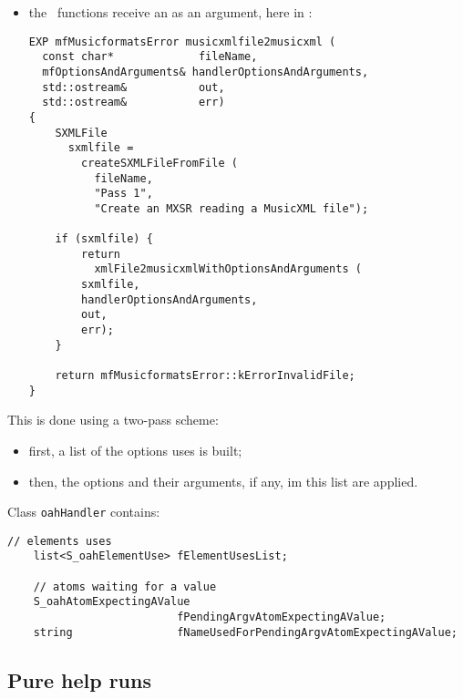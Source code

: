 {\begin{itemize}
\begin{lstlisting}[language=CPlusPlus]
  // create the global run data
  // ------------------------------------------------------

  gGlobalServiceRunData =
    mfServiceRunData::create (serviceName);

  // ... ... ...
}
\end{lstlisting}

\item the \API\ functions receive an  as an argument, here in :
\begin{lstlisting}[language=CPlusPlus]
EXP mfMusicformatsError musicxmlfile2musicxml (
  const char*             fileName,
  mfOptionsAndArguments& handlerOptionsAndArguments,
  std::ostream&           out,
  std::ostream&           err)
{
	SXMLFile
	  sxmlfile =
	    createSXMLFileFromFile (
	      fileName,
	      "Pass 1",
	      "Create an MXSR reading a MusicXML file");

	if (sxmlfile) {
		return
		  xmlFile2musicxmlWithOptionsAndArguments (
        sxmlfile,
        handlerOptionsAndArguments,
        out,
        err);
	}

	return mfMusicformatsError::kErrorInvalidFile;
}
\end{lstlisting}

\end{itemize}

This is done using a two-pass scheme:
\begin{itemize}
\item first, a list of the options uses is built;
\item then, the options and their arguments, if any, im this list are applied.
\end{itemize}

Class {\tt oahHandler} contains:
\begin{lstlisting}[language=CPlusPlus]
    // elements uses
    list<S_oahElementUse> fElementUsesList;

    // atoms waiting for a value
    S_oahAtomExpectingAValue
                          fPendingArgvAtomExpectingAValue;
    string                fNameUsedForPendingArgvAtomExpectingAValue;
\end{lstlisting}


	\subsection{Pure help runs}

}
